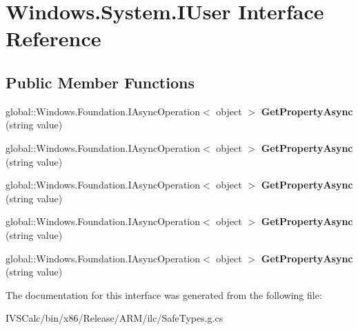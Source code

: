 \hypertarget{interface_windows_1_1_system_1_1_i_user}{}\section{Windows.\+System.\+I\+User Interface Reference}
\label{interface_windows_1_1_system_1_1_i_user}
\subsection*{Public Member Functions}
\begin{DoxyCompactItemize}
\item 
\mbox{\label{interface_windows_1_1_system_1_1_i_user_a08b3c1f6290d8893d73f7eb44c177f18}} 
global\+::\+Windows.\+Foundation.\+I\+Async\+Operation$<$ object $>$ {\bfseries Get\+Property\+Async} (string value)
\item 
\mbox{\label{interface_windows_1_1_system_1_1_i_user_a08b3c1f6290d8893d73f7eb44c177f18}} 
global\+::\+Windows.\+Foundation.\+I\+Async\+Operation$<$ object $>$ {\bfseries Get\+Property\+Async} (string value)
\item 
\mbox{\label{interface_windows_1_1_system_1_1_i_user_a08b3c1f6290d8893d73f7eb44c177f18}} 
global\+::\+Windows.\+Foundation.\+I\+Async\+Operation$<$ object $>$ {\bfseries Get\+Property\+Async} (string value)
\item 
\mbox{\label{interface_windows_1_1_system_1_1_i_user_a08b3c1f6290d8893d73f7eb44c177f18}} 
global\+::\+Windows.\+Foundation.\+I\+Async\+Operation$<$ object $>$ {\bfseries Get\+Property\+Async} (string value)
\item 
\mbox{\label{interface_windows_1_1_system_1_1_i_user_a08b3c1f6290d8893d73f7eb44c177f18}} 
global\+::\+Windows.\+Foundation.\+I\+Async\+Operation$<$ object $>$ {\bfseries Get\+Property\+Async} (string value)
\end{DoxyCompactItemize}


The documentation for this interface was generated from the following file\+:\begin{DoxyCompactItemize}
\item 
I\+V\+S\+Calc/bin/x86/\+Release/\+A\+R\+M/ilc/Safe\+Types.\+g.\+cs\end{DoxyCompactItemize}
